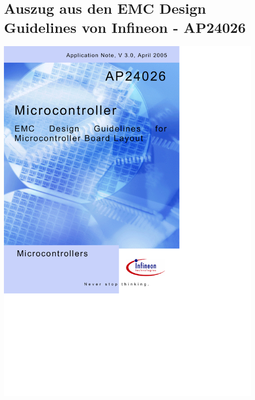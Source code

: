 \section{Auszug aus den EMC Design Guidelines von Infineon - AP24026}
\begin{center}
	\includegraphics[page=17,width=0.85\columnwidth]{./datenblaetter/infineon_design}
\end{center}

